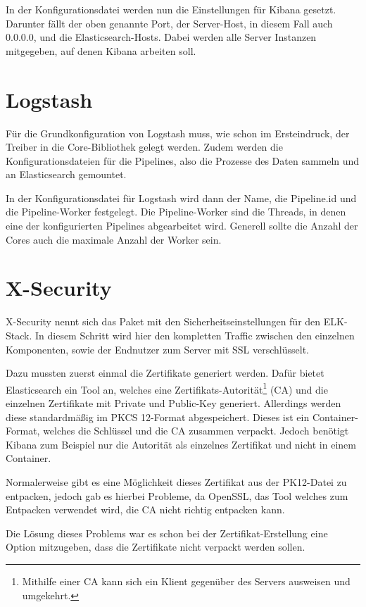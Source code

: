 In der Konfigurationsdatei werden nun die Einstellungen für Kibana gesetzt. Darunter fällt der oben genannte Port, der Server-Host, in diesem Fall auch 0.0.0.0, und die Elasticsearch-Hosts. Dabei werden alle Server Instanzen mitgegeben, auf denen Kibana arbeiten soll. 

\section{Logstash}

Für die Grundkonfiguration von Logstash muss, wie schon im Ersteindruck, der Treiber in die Core-Bibliothek gelegt werden. Zudem werden die Konfigurationsdateien für die Pipelines, also die Prozesse des Daten sammeln und an Elasticsearch gemountet.

In der Konfigurationsdatei für Logstash wird dann der Name, die Pipeline.id und die Pipeline-Worker festgelegt. Die Pipeline-Worker sind die Threads, in denen eine der konfigurierten Pipelines abgearbeitet wird. Generell sollte die Anzahl der Cores auch die maximale Anzahl der Worker sein.


\section{X-Security}

X-Security nennt sich das Paket mit den Sicherheitseinstellungen für den ELK-Stack. In diesem Schritt wird hier den kompletten Traffic zwischen den einzelnen Komponenten, sowie der Endnutzer zum Server mit SSL verschlüsselt. 

Dazu mussten zuerst einmal die Zertifikate generiert werden. Dafür bietet Elasticsearch ein Tool an, welches eine Zertifikats-Autorität\footnote{Mithilfe einer CA kann sich ein Klient gegenüber des Servers ausweisen und umgekehrt.} (CA) und die einzelnen Zertifikate mit Private und Public-Key generiert. Allerdings werden diese standardmäßig im PKCS 12-Format abgespeichert. Dieses ist ein Container-Format, welches die Schlüssel und die CA zusammen verpackt. Jedoch benötigt Kibana zum Beispiel nur die Autorität als einzelnes Zertifikat und nicht in einem Container.

Normalerweise gibt es eine Möglichkeit dieses Zertifikat aus der PK12-Datei zu entpacken, jedoch gab es hierbei Probleme, da OpenSSL, das Tool welches zum Entpacken verwendet wird, die CA nicht richtig entpacken kann. \cite{nerophon.2018}

Die Lösung dieses Problems war es schon bei der Zertifikat-Erstellung eine Option mitzugeben, dass die Zertifikate nicht verpackt werden sollen. 

